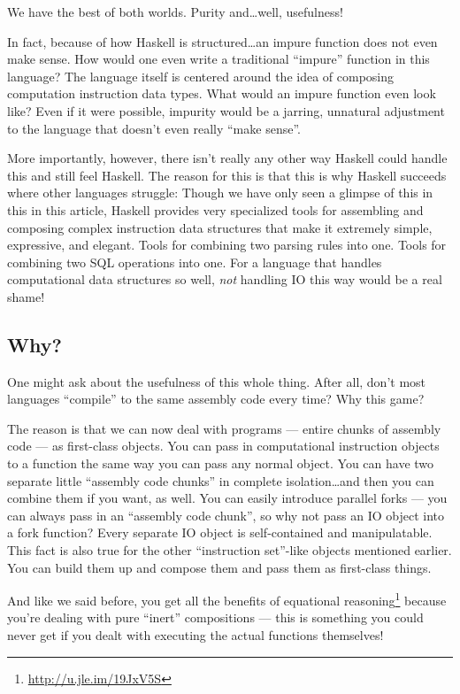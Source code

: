 \documentclass[]{article}
\renewcommand{\href}[2]{#2\footnote{\url{#1}}}
\begin{document}
We have the best of both worlds. Purity and\ldots{}well, usefulness!

In fact, because of how Haskell is structured\ldots{}an impure function does not
even make sense. How would one even write a traditional ``impure'' function in
this language? The language itself is centered around the idea of composing
computation instruction data types. What would an impure function even look
like? Even if it were possible, impurity would be a jarring, unnatural
adjustment to the language that doesn't even really ``make sense''.

More importantly, however, there isn't really any other way Haskell could handle
this and still feel Haskell. The reason for this is that this is why Haskell
succeeds where other languages struggle: Though we have only seen a glimpse of
this in this in this article, Haskell provides very specialized tools for
assembling and composing complex instruction data structures that make it
extremely simple, expressive, and elegant. Tools for combining two parsing rules
into one. Tools for combining two SQL operations into one. For a language that
handles computational data structures so well, \emph{not} handling IO this way
would be a real shame!

\hypertarget{why}{%
\subsection{Why?}\label{why}}

One might ask about the usefulness of this whole thing. After all, don't most
languages ``compile'' to the same assembly code every time? Why this game?

The reason is that we can now deal with programs --- entire chunks of assembly
code --- as first-class objects. You can pass in computational instruction
objects to a function the same way you can pass any normal object. You can have
two separate little ``assembly code chunks'' in complete isolation\ldots{}and
then you can combine them if you want, as well. You can easily introduce
parallel forks --- you can always pass in an ``assembly code chunk'', so why not
pass an IO object into a fork function? Every separate IO object is
self-contained and manipulatable. This fact is also true for the other
``instruction set''-like objects mentioned earlier. You can build them up and
compose them and pass them as first-class things.

And like we said before, you get all the benefits of
\href{http://u.jle.im/19JxV5S}{equational reasoning} because you're dealing with
pure ``inert'' compositions --- this is something you could never get if you
dealt with executing the actual functions themselves!
\end{document}
